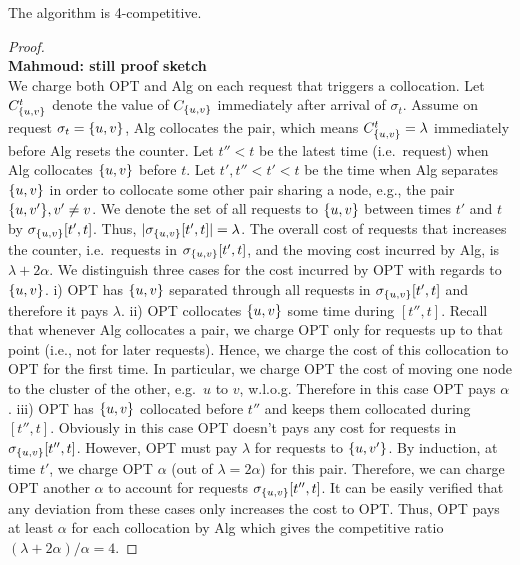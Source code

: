 \documentclass[manuscript,screen=true, review, anonymous]{acmart}
\DeclarePairedDelimiter\set{\{}{\}}
\newcommand\mahmoud[1]{\color{green}\textbf{\\ Mahmoud: #1}\\\color{black}}
\begin{document}
\begin{theorem}
	The algorithm is 4-competitive.
\end{theorem}
\begin{proof}
\mahmoud{still proof sketch}
We charge both OPT and Alg on each request that triggers a collocation.
Let $C^{t}_{\set{u,v}}$ denote the  value of $C_{\set{u,v}}$ immediately after arrival of $\sigma_t$.
Assume on request $\sigma_{t}=\set{u,v}$,
Alg collocates the pair,
which means $ C^t_{\set{u,v}} = \lambda$ immediately before Alg resets the counter.
Let $t''<t$ be the latest time (i.e.~request) when Alg collocates $\set{u,v}$ before $t$.
Let $t', t'' < t' < t$ be the  time when Alg separates $\set{u,v}$
in order to collocate some other pair sharing a node,
e.g., the pair $\set{u,v'}, v' \neq v$.
We denote the set of all requests to $\set{u,v}$
between times $t'$ and $t$ by $\sigma_{\set{u,v}}[t',t]$.
Thus,
$| \sigma_{\set{u,v}}[t',t] | = \lambda$.
The overall cost of requests that increases the counter,
i.e.~requests in $\sigma_{\set{u,v}}[t',t]$,
and the moving cost incurred by Alg,
 is $\lambda + 2\alpha$.
We distinguish three cases for the cost incurred by OPT with regards to $\set{u,v}$.
i)
OPT has $\set{u,v}$ separated through all requests in $\sigma_{\set{u,v}}[t',t]$
and therefore it pays $\lambda$.
ii)  
OPT collocates $\set{u,v}$ some time during $[t'',t]$.
Recall that whenever Alg collocates a pair,
we charge OPT only for requests up to that point (i.e., not for later requests).
Hence,
we charge the cost of  this collocation to OPT for the first time.
In particular,
we charge OPT the cost of moving one node to the cluster of the other,
e.g.~$u$ to $v$, w.l.o.g.
Therefore in this case OPT pays $\alpha$.
iii)
OPT has $\set{u,v}$ collocated before $t''$ and keeps them collocated during $[t'',t]$.
Obviously in this case OPT doesn't pays any cost for requests in $\sigma_{\set{u,v}}[t'',t]$.
However,
OPT must pay $\lambda$ for requests to $\set{u,v'}$.
By induction,
at time $t'$,
we charge OPT $\alpha$ (out of $\lambda=2\alpha$) for this pair.
Therefore,
we can charge OPT another $\alpha$ to account for requests $\sigma_{\set{u,v}}[t'',t]$.
It can be easily verified that any deviation from these cases only increases the cost to OPT.
Thus,
OPT pays at least $\alpha$ for each collocation by Alg
which gives the competitive ratio 
$(\lambda + 2\alpha)/ \alpha = 4$.

\end{proof}
\end{document}
